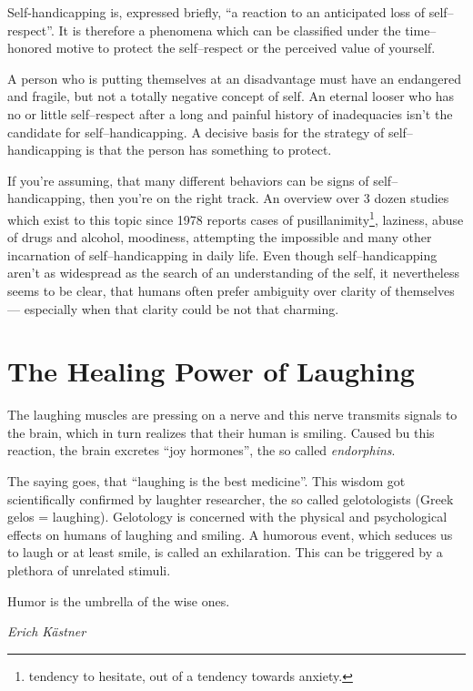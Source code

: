 \documentclass[../Book.Stress_regulation.tex]{subfiles}
\begin{document}
{  Self-handicapping is, expressed briefly, ``a reaction to an anticipated loss of self--respect''.
  It is therefore a phenomena which can be classified under the time--honored motive to protect the self--respect or the perceived value of yourself.

  A person who is putting themselves at an disadvantage must have an endangered and fragile, but not a totally negative concept of self.
  An eternal looser who has no or little self--respect after a long and painful history of inadequacies isn't the candidate for self--handicapping.
  A decisive basis for the strategy of self--handicapping is that the person has something to protect.

  If you're assuming, that many different behaviors can be signs of self--handicapping, then you're on the right track.
  An overview over 3 dozen studies which exist to this topic since 1978 reports cases of pusillanimity\footnote{tendency to hesitate, out of a tendency towards anxiety.},
  laziness, abuse of drugs and alcohol, moodiness, attempting the impossible and many other incarnation of self--handicapping in daily life.
  Even though self--handicapping aren't as widespread as the search of an understanding of the self,
  it nevertheless seems to be clear, that humans often prefer ambiguity over clarity of themselves ---
  especially when that clarity could be not that charming.
}

\chapter{The Healing Power of Laughing}

The laughing muscles are pressing on a nerve and this nerve transmits signals to the brain, which in turn realizes that their human is smiling.
Caused bu this reaction, the brain excretes ``joy hormones'', the so called \emph{endorphins}.

The saying goes, that ``laughing is the best medicine''.
This wisdom got scientifically confirmed by laughter researcher, the so called gelotologists (Greek gelos = laughing).
Gelotology is concerned with the physical and psychological effects on humans of laughing and smiling.
A humorous event, which seduces us to laugh or at least smile, is called an exhilaration.
This can be triggered by a plethora of unrelated stimuli.

\epigraph{Humor is the umbrella of the wise ones.}{\textit{Erich K\"astner}}
\end{document}
